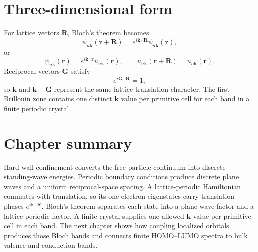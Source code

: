 \section{Three-dimensional form}

For lattice vectors $\bm R$, Bloch's theorem becomes
\begin{equation}
  \psi_{n\bm k}(\bm r+\bm R)
  =e^{i\bm k\cdot\bm R}\psi_{n\bm k}(\bm r),
  \label{eq:bloch-translation-three-dimensional}
\end{equation}
or
\begin{equation}
  \psi_{n\bm k}(\bm r)
  =e^{i\bm k\cdot\bm r}u_{n\bm k}(\bm r),
  \qquad
  u_{n\bm k}(\bm r+\bm R)=u_{n\bm k}(\bm r).
  \label{eq:bloch-theorem-three-dimensional}
\end{equation}
Reciprocal vectors $\bm G$ satisfy
\begin{equation}
  e^{i\bm G\cdot\bm R}=1,
  \label{eq:reciprocal-lattice-definition}
\end{equation}
so $\bm k$ and $\bm k+\bm G$ represent the same lattice-translation character.
The first Brillouin zone contains one distinct $\bm k$ value per primitive cell
for each band in a finite periodic crystal.

\section{Chapter summary}

Hard-wall confinement converts the free-particle continuum into discrete
standing-wave energies.  Periodic boundary conditions produce discrete plane
waves and a uniform reciprocal-space spacing.  A lattice-periodic Hamiltonian
commutes with translation, so its one-electron eigenstates carry translation
phases $e^{i\bm k\cdot\bm R}$.  Bloch's theorem separates each state into a
plane-wave factor and a lattice-periodic factor.  A finite crystal supplies one
allowed $\bm k$ value per primitive cell in each band.  The next chapter shows
how coupling localized orbitals produces those Bloch bands and connects finite
HOMO--LUMO spectra to bulk valence and conduction bands.
